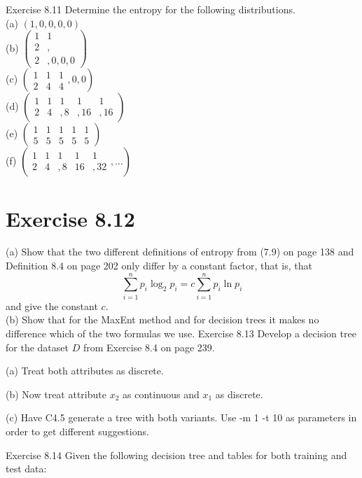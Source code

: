 \documentclass[10pt]{book}
\begin{document}
Exercise 8.11 Determine the entropy for the following distributions.\\
(a) $(1,0,0,0,0)$\\
(b) $\left(\begin{array}{ll}1 & 1 \\ 2 & , \\ 2 & , 0,0,0\end{array}\right)$\\
(c) $\left(\begin{array}{ccc}1 & 1 & 1 \\ 2 & 4 & 4\end{array}, 0,0\right)$\\
(d) $\left(\begin{array}{ccccc}1 & 1 & 1 & 1 & 1 \\ 2 & 4 & , 8 & , 16 & , 16\end{array}\right)$\\
(e) $\left(\begin{array}{ccccc}1 & 1 & 1 & 1 & 1 \\ 5 & 5 & 5 & 5 & 5\end{array}\right)$\\
(f) $\left(\begin{array}{ccccc}1 & 1 & 1 & 1 & 1 \\ 2 & 4 & , 8 & 16 & , 32\end{array}, \ldots\right)$

\section{Exercise 8.12}
(a) Show that the two different definitions of entropy from (7.9) on page 138 and Definition 8.4 on page 202 only differ by a constant factor, that is, that
\[
\sum_{i=1}^{n} p_{i} \log _{2} p_{i}=c \sum_{i=1}^{n} p_{i} \ln p_{i}
\]
and give the constant $c$.\\
(b) Show that for the MaxEnt method and for decision trees it makes no difference which of the two formulas we use.
Exercise 8.13 Develop a decision tree for the dataset $D$ from Exercise 8.4 on page 239.

(a) Treat both attributes as discrete.

(b) Now treat attribute $x_{2}$ as continuous and $x_{1}$ as discrete.

(c) Have C4.5 generate a tree with both variants. Use -m 1 -t 10 as parameters in order to get different suggestions.

Exercise 8.14 Given the following decision tree and tables for both training and test data:
\end{document}
